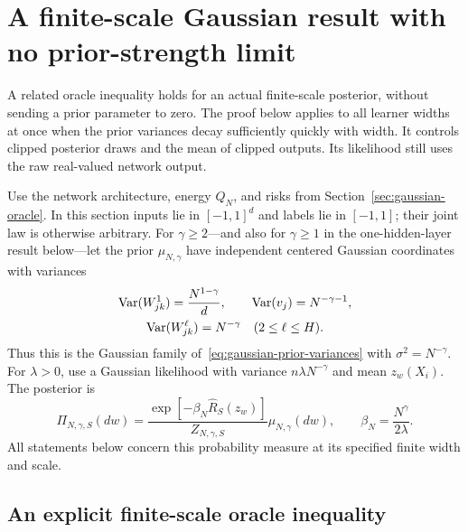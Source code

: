 \section{A finite-scale Gaussian result with no prior-strength limit}
\label{sec:finite-gaussian-oracle}

A related oracle inequality holds for an actual finite-scale posterior,
without sending a prior parameter to zero.  The proof below applies to
all learner widths at once when the prior variances decay sufficiently
quickly with width.  It controls clipped posterior draws and the mean
of clipped outputs.  Its likelihood still uses the raw real-valued
network output.

Use the network architecture, energy $Q_N$, and risks from
Section~\ref{sec:gaussian-oracle}.  In this section inputs lie in
$[-1,1]^d$ and labels lie in $[-1,1]$; their joint law is otherwise
arbitrary.  For $\gamma\geq2$---and also for $\gamma\geq1$ in the
one-hidden-layer result below---let the prior $\mu_{N,\gamma}$ have
independent centered Gaussian coordinates with variances
\begin{gather}
 \operatorname{Var}(W^1_{jk})=\frac{N^{1-\gamma}}d,\qquad
 \operatorname{Var}(v_j)=N^{-\gamma-1},\notag\\
 \operatorname{Var}(W^\ell_{jk})=N^{-\gamma}\quad(2\leq\ell\leq H).
 \label{eq:finite-prior}
\end{gather}
Thus this is the Gaussian family of~\eqref{eq:gaussian-prior-variances}
with $\sigma^2=N^{-\gamma}$.  For $\lambda>0$, use a Gaussian likelihood
with variance $n\lambda N^{-\gamma}$ and mean $z_w(X_i)$.  The posterior
is
\begin{equation}
 \Pi_{N,\gamma,S}(dw)
   =\frac{\exp[-\beta_N\widehat R_S(z_w)]}{Z_{N,\gamma,S}}
          \mu_{N,\gamma}(dw),
 \qquad \beta_N=\frac{N^\gamma}{2\lambda}.
 \label{eq:finite-posterior}
\end{equation}
All statements below concern this probability measure at its specified
finite width and scale.

\subsection{An explicit finite-scale oracle inequality}

